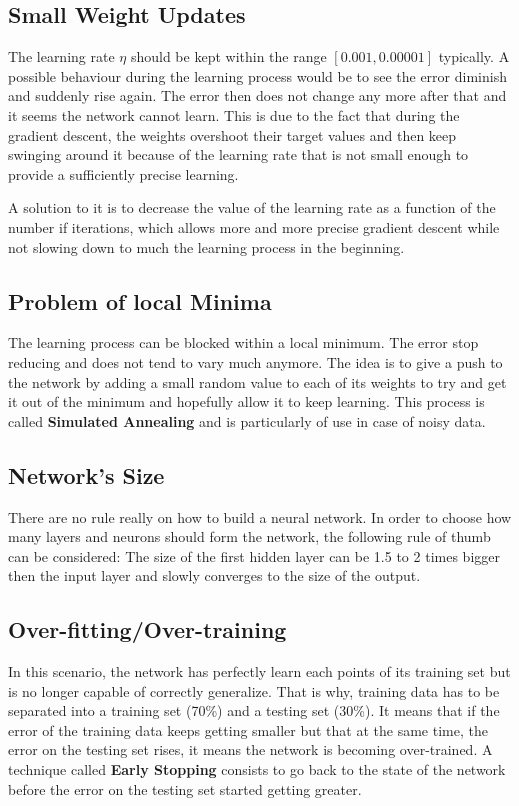 \documentclass[10pt,a4paper]{article}
\begin{document}
\subsection{Small Weight Updates}
The learning rate $\eta$ should be kept within the range $[0.001, 0.00001]$ typically. A possible behaviour during the learning process would be to see the error diminish and suddenly rise again. The error then does not change any more after that and it seems the network cannot learn. This is due to the fact that during the gradient descent, the weights overshoot their target values and then keep swinging around it because of the learning rate that is not small enough to provide a sufficiently precise learning. 

A solution to it is to decrease the value of the learning rate as a function of the number if iterations, which allows more and more precise gradient descent while not slowing down to much the learning process in the beginning. 
\subsection{Problem of local Minima}
The learning process can be blocked within a local minimum. The error stop reducing and does not tend to vary much anymore. The idea is to give a push to the network by adding a small random value to each of its weights to try and get it out of the minimum and hopefully allow it to keep learning. This process is called \textbf{Simulated Annealing} and is particularly of use in case of noisy data. 
\subsection{Network's Size}
There are no rule really on how to build a neural network. In order to choose how many layers and neurons should form the network, the following rule of thumb can be considered:
The size of the first hidden layer can be 1.5 to 2 times bigger then the input layer and slowly converges to the size of the output. 
\subsection{Over-fitting/Over-training}
In this scenario, the network has perfectly learn each points of its training set but is no longer capable of correctly generalize. That is why, training data has to be separated into a training set (70\%) and a testing set (30\%). It means that if the error of the training data keeps getting smaller but that at the same time, the error on the testing set rises, it means the network is becoming over-trained. A technique called \textbf{Early Stopping} consists to go back to the state of the network before the error on the testing set started getting greater. 
\end{document}
